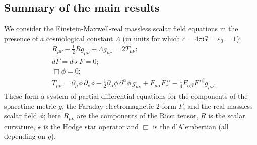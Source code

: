\documentclass[a4paper,11pt,oneside,reqno]{amsart}
\begin{document}
\subsection{Summary of the main results}

We consider the Einstein-Maxwell-real massless scalar field equations in the presence of a cosmological constant $\Lambda$ (in units for which $c=4\pi G=\varepsilon_0=1$):
\begin{align*}
& R_{\mu\nu} - \frac12 R g_{\mu\nu} + \Lambda g_{\mu\nu} = 2 T_{\mu\nu}; \\
& dF = d\star F = 0; \\
& \Box \phi = 0; \\
& T_{\mu\nu} = \partial_\mu \phi \, \partial_\nu \phi - \frac12 \partial_\alpha \phi \, \partial^\alpha \phi \, g_{\mu\nu} + F_{\mu\alpha} F_{\nu}^{\,\,\alpha} - \frac14 F_{\alpha\beta} F^{\alpha \beta} g_{\mu\nu}.
\end{align*}
These form a system of partial differential equations for the components of the spacetime metric $g$, the Faraday electromagnetic $2$-form $F$, and the real massless scalar field $\phi$; here $R_{\mu\nu}$ are the components of the Ricci tensor, $R$ is the scalar curvature, $\star$ is the Hodge star operator and $\Box$ is the d'Alembertian (all depending on $g$).
\end{document}

